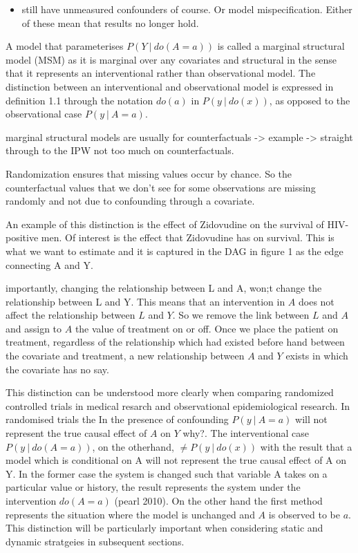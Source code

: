 \documentclass[11pt]{article}
\providecommand{\tightlist}{%
      \setlength{\itemsep}{0pt}\setlength{\parskip}{0pt}}
\begin{document}
\begin{itemize}
\tightlist
\item
  still have unmeasured confounders of course. Or model mispecification.
  Either of these mean that results no longer hold.
\end{itemize}

A model that parameterises \(P(Y\ |\ do(A=a))\) is called a marginal
structural model (MSM) as it is marginal over any covariates and
structural in the sense that it represents an interventional rather than
observational model. The distinction between an interventional and
observational model is expressed in definition 1.1 through the notation
\(do(a)\) in \(P(y\ |\ do(x))\), as opposed to the observational case
\(P(y\ |\ A=a)\).

marginal structural models are usually for counterfactuals
-\textgreater{} example -\textgreater{} straight through to the IPW not
too much on counterfactuals.

Randomization ensures that missing values occur by chance. So the
counterfactual values that we don't see for some observations are
missing randomly and not due to confounding through a covariate.

    An example of this distinction is the effect of Zidovudine on the
survival of HIV-positive men. Of interest is the effect that Zidovudine
has on survival. This is what we want to estimate and it is captured in
the DAG in figure 1 as the edge connecting A and Y.

importantly, changing the relationship between L and A, won;t change the
relationship between L and Y. This means that an intervention in \(A\)
does not affect the relationship between \(L\) and \(Y\). So we remove
the link between \(L\) and \(A\) and assign to \(A\) the value of
treatment on or off. Once we place the patient on treatment, regardless
of the relationship which had existed before hand between the covariate
and treatment, a new relationship between \(A\) and \(Y\) exists in
which the covariate has no say.

This distinction can be understood more clearly when comparing
randomized controlled trials in medical resarch and observational
epidemiological research. In randomised trials the In the presence of
confounding \(P(y\ |\ A=a)\) will not represent the true causal effect
of \(A\) on \(Y\) why?. The interventional case \(P(y\ |\ do(A=a))\), on
the otherhand, \(\ne P(y\ |\ do(x))\) with the result that a model which
is conditional on A will not represent the true causal effect of A on Y.
In the former case the system is changed such that variable A takes on a
particular value or history, the result represents the system under the
intervention \(do(A=a)\) (pearl 2010). On the other hand the first
method represents the situation where the model is unchanged and \(A\)
is observed to be \(a\). This distinction will be particularly important
when considering static and dynamic stratgeies in subsequent sections.
\end{document}
